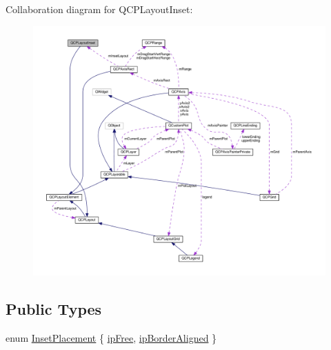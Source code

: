 Collaboration diagram for Q\+C\+P\+Layout\+Inset\+:
\nopagebreak
\begin{figure}[H]
\begin{center}
\leavevmode
\includegraphics[width=350pt]{classQCPLayoutInset__coll__graph}
\end{center}
\end{figure}
\subsection*{Public Types}
\begin{DoxyCompactItemize}
\item 
enum \hyperlink{classQCPLayoutInset_a8b9e17d9a2768293d2a7d72f5e298192}{Inset\+Placement} \{ \hyperlink{classQCPLayoutInset_a8b9e17d9a2768293d2a7d72f5e298192aa4802986ea2cea457f932b115acba59e}{ip\+Free}, 
\hyperlink{classQCPLayoutInset_a8b9e17d9a2768293d2a7d72f5e298192aa81e7df4a785ddee2229a8f47c46e817}{ip\+Border\+Aligned}
 \}
\end{DoxyCompactItemize}
